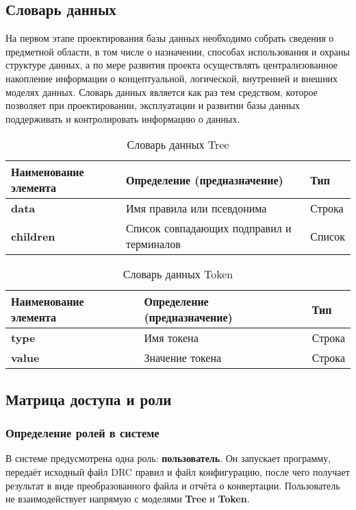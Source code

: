 \subsection{Словарь данных}

На первом этапе проектирования базы данных необходимо собрать сведения о
предметной области, в том числе о назначении, способах использования и охраны
структуре данных, а по мере развития проекта осуществлять централизованное
накопление информации о концептуальной, логической, внутренней и внешних
моделях данных. Словарь данных является как раз тем средством, которое
позволяет при проектировании, эксплуатации и развитии базы данных
поддерживать и контролировать информацию о данных.

\begin{longtable}{|p{4cm}|p{8cm}|p{4cm}|}
	\caption{Словарь данных Tree} \\
	\hline
	\textbf{Наименование элемента}
	& \textbf{Определение (предназначение)}
	& \textbf{Тип} \\
	\hline
	\endhead
	\textbf{data} & Имя правила или псевдонима & Строка \\ \hline
	\textbf{children}
	& Список совпадающих подправил и терминалов
	& Список \\ \hline
\end{longtable}

\begin{longtable}{|p{4cm}|p{8cm}|p{4cm}|}
	\caption{Словарь данных Token} \\
	\hline
	\textbf{Наименование элемента}
	& \textbf{Определение (предназначение)}
	& \textbf{Тип} \\
	\hline
	\endhead
	\textbf{type} & Имя токена & Строка \\ \hline
	\textbf{value} & Значение токена & Строка \\ \hline
\end{longtable}

\subsection{Матрица доступа и роли}

\subsubsection{Определение ролей в системе}

В системе предусмотрена одна роль: \textbf{пользователь}.
Он запускает программу, передаёт исходный файл DRC правил и файл конфигурацию,
после чего получает результат в виде преобразованного файла
и отчёта о конвертации.
Пользователь не взаимодействует напрямую
с моделями \textbf{Tree} и \textbf{Token}.

